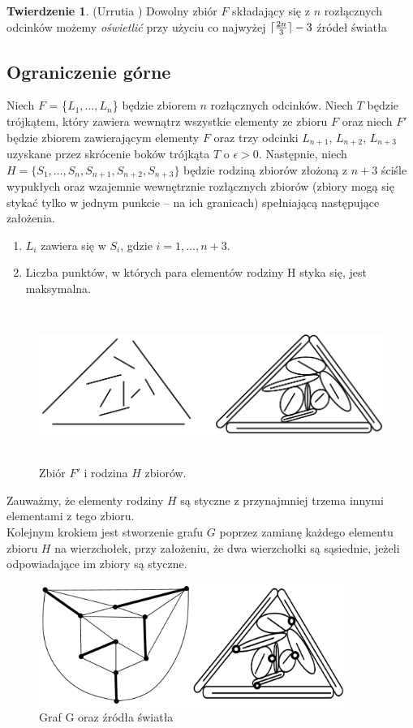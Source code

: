 \documentclass[brudnopis]{xmgr}
\DeclarePairedDelimiter\ceil{\lceil}{\rceil}
\theoremstyle{definition}
\newtheorem{Twierdzenie}{Twierdzenie}
\begin{document}
\begin{Twierdzenie} (Urrutia \cite{illumination})
 Dowolny zbiór $F$ składający się z $n$ rozłącznych odcinków możemy \emph{oświetlić} przy użyciu co najwyżej $\ceil{\frac{2n}{3}} - 3$ źródeł światła
\end{Twierdzenie}

\subsection{Ograniczenie górne}
\indent Niech $F$ = \{$L_1, \ldots, L_n$\} będzie zbiorem $n$ rozłącznych odcinków. Niech $T$ będzie trójkątem, który zawiera wewnątrz wszystkie elementy ze zbioru $F$ oraz niech $F'$ będzie zbiorem zawierającym elementy $F$ oraz trzy odcinki $L_{n+1}$, $L_{n+2}$, $L_{n+3}$ uzyskane przez skrócenie boków trójkąta $T$ o $\epsilon > 0$.
Następnie, niech $H = \{S_1,\ldots,S_n,S_{n+1},S_{n+2},S_{n+3}\}$ będzie rodziną zbiorów złożoną z $n + 3$ ściśle wypukłych oraz wzajemnie wewnętrznie rozłącznych zbiorów (zbiory mogą się stykać tylko w jednym punkcie -- na ich granicach) spełniającą następujące założenia.
\begin{enumerate}
  \item $L_i$ zawiera się w $S_i$, gdzie $i = 1,\ldots,n+3$.
  \item Liczba punktów, w których para elementów rodziny H styka się, jest maksymalna.
\end{enumerate}
\begin{figure}[ht!]
 \centering
  \includegraphics[height=5cm, width=13.5cm]{rysunki/podswietlenie.png}
  \caption{Zbiór $F'$ i rodzina $H$ zbiorów.}
\end{figure} 
Zauważmy, że elementy rodziny $H$ są styczne z przynajmniej trzema innymi elementami z tego zbioru. 
\\\indent Kolejnym krokiem jest stworzenie grafu $G$ poprzez zamianę każdego elementu zbioru $H$ na wierzchołek, przy założeniu, że dwa wierzchołki są sąsiednie, jeżeli odpowiadające im zbiory są styczne.
\begin{figure}[ht!]
 \centering
  \includegraphics[height=4cm]{rysunki/skojarzenia_zrodla_swiatla.png}
  \caption{Graf G oraz źródła światła}
\end{figure}
\end{document}
